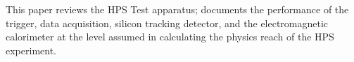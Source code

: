 \documentclass[final,3p,times,twocolumn]{elsarticle}
\newcommand{\ee}{e$^+$e$^-$}
\begin{document}
This paper reviews the HPS Test apparatus; documents the performance of the trigger, 
data acquisition, silicon tracking detector, and the electromagnetic calorimeter at the level assumed 
in calculating the physics reach of the HPS experiment. 




\end{document}
